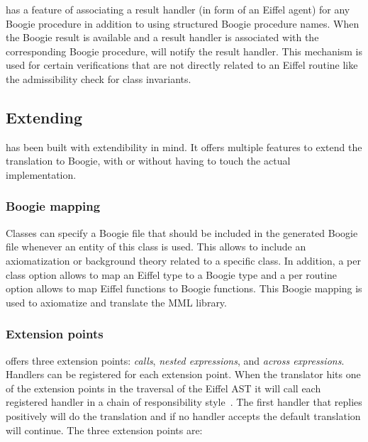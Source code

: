 \AutoProof has a feature of associating a result handler (in form of an Eiffel agent) for any Boogie procedure in addition to using structured Boogie procedure names. When the Boogie result is available and a result handler is associated with the corresponding Boogie procedure, \AutoProof will notify the result handler. This mechanism is used for certain verifications that are not directly related to an Eiffel routine like the admissibility check for class invariants.


\subsection{Extending \AutoProof}

\AutoProof has been built with extendibility in mind. It offers multiple features to extend the translation to Boogie, with or without having to touch the actual implementation.

\subsubsection{Boogie mapping}

Classes can specify a Boogie file that should be included in the generated Boogie file whenever an entity of this class is used. This allows to include an axiomatization or background theory related to a specific class. In addition, a per class option allows to map an Eiffel type to a Boogie type and a per routine option allows to map Eiffel functions to Boogie functions. This Boogie mapping is used to axiomatize and translate the MML library.

\subsubsection{Extension points}

\AutoProof offers three extension points: \emph{calls}, \emph{nested expressions}, and \emph{across expressions}. Handlers can be registered for each extension point. When the translator hits one of the extension points in the traversal of the Eiffel AST it will call each registered handler in a chain of responsibility style~\cite{GAMMA95}. The first handler that replies positively will do the translation and if no handler accepts the default translation will continue. The three extension points are:

